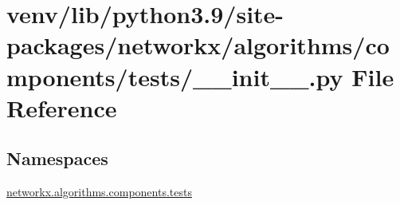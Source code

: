 \hypertarget{venv_2lib_2python3_89_2site-packages_2networkx_2algorithms_2components_2tests_2____init_____8py}{}\section{venv/lib/python3.9/site-\/packages/networkx/algorithms/components/tests/\+\_\+\+\_\+init\+\_\+\+\_\+.py File Reference}
\label{venv_2lib_2python3_89_2site-packages_2networkx_2algorithms_2components_2tests_2____init_____8py}
\subsection*{Namespaces}
\begin{DoxyCompactItemize}
\item 
 \hyperlink{namespacenetworkx_1_1algorithms_1_1components_1_1tests}{networkx.\+algorithms.\+components.\+tests}
\end{DoxyCompactItemize}
